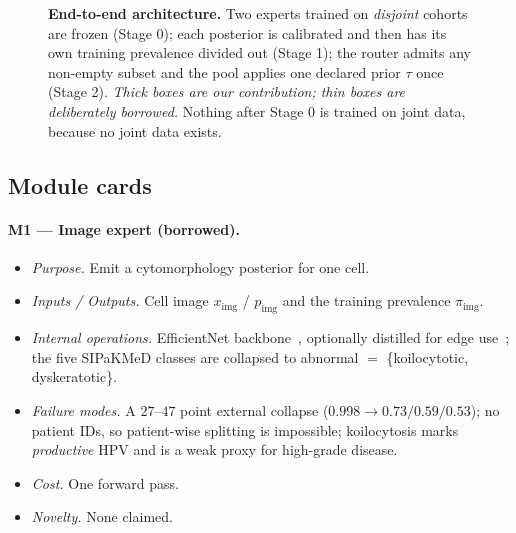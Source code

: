 \documentclass[sigplan,nonacm,screen]{acmart}
\begin{document}
\begin{figure}[t]
{}
\caption{\textbf{End-to-end architecture.} Two experts trained on \emph{disjoint} cohorts are frozen (Stage 0); each posterior is calibrated and then has its own training prevalence divided out (Stage 1); the router admits any non-empty subset and the pool applies one declared prior $\tau$ once (Stage 2). \emph{Thick boxes are our contribution; thin boxes are deliberately borrowed.} Nothing after Stage 0 is trained on joint data, because no joint data exists.}
\label{fig:arch}
\end{figure}

\subsection{Module cards}

\paragraph{M1 --- Image expert (borrowed).}
\begin{itemize}
  \item \emph{Purpose.} Emit a cytomorphology posterior for one cell.
  \item \emph{Inputs / Outputs.} Cell image $x_{\mathrm{img}}$ / $p_{\mathrm{img}}$ and the training prevalence $\pi_{\mathrm{img}}$.
  \item \emph{Internal operations.} EfficientNet backbone~\cite{tan2019efficientnet}, optionally distilled for edge use~\cite{hinton2015distilling}; the five SIPaKMeD classes are collapsed to abnormal $=$ \{koilocytotic, dyskeratotic\}.
  \item \emph{Failure modes.} A $27$--$47$ point external collapse ($0.998\!\to\!0.73/0.59/0.53$); no patient IDs, so patient-wise splitting is impossible; koilocytosis marks \emph{productive} HPV and is a weak proxy for high-grade disease.
  \item \emph{Cost.} One forward pass.
  \item \emph{Novelty.} None claimed.
\end{itemize}
\end{document}
